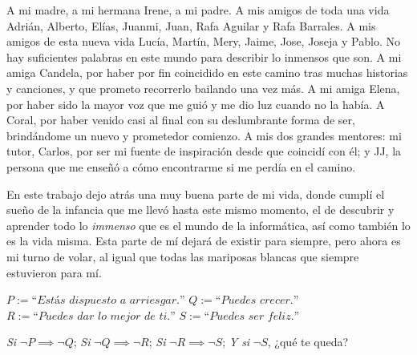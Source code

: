 A mi madre, a mi hermana Irene, a mi padre. A mis amigos de toda una vida Adrián, Alberto, Elías, Juanmi, Juan, Rafa Aguilar y Rafa Barrales. A mis amigos de esta nueva vida Lucía, Martín, Mery, Jaime, Jose, Joseja y Pablo. No hay suficientes palabras en este mundo para describir lo inmensos que son. A mi amiga Candela, por haber por fin coincidido en este camino tras muchas historias y canciones, y que prometo recorrerlo bailando una vez más. A mi amiga Elena, por haber sido la mayor voz que me guió y me dio luz cuando no la había. A Coral, por haber venido casi al final con su deslumbrante forma de ser, brindándome un nuevo y prometedor comienzo. A mis dos grandes mentores: mi tutor, Carlos, por ser mi fuente de inspiración desde que coincidí con él; y JJ, la persona que me enseñó a cómo encontrarme si me perdía en el camino.

\vspace{0.2cm}
En este trabajo dejo atrás una muy buena parte de mi vida, donde cumplí el sueño de la infancia que me llevó hasta este mismo momento, el de descubrir y aprender todo lo \textit{immenso} que es el mundo de la informática, así como también lo es la vida misma. Esta parte de mí dejará de existir para siempre, pero ahora es mi turno de volar, al igual que todas las mariposas blancas que siempre estuvieron para mí.

\newpage
\vspace*{\fill}

\large
\noindent
$P := \textit{``Estás dispuesto a arriesgar.''}$
\newline
$Q := \textit{``Puedes crecer.''}$
\newline
$R := \textit{``Puedes dar lo mejor de ti.''}$
\newline
$S := \textit{``Puedes ser feliz.''}$
\newline
\newline

\noindent
\textit{Si} $\neg P \implies \neg Q$;
\newline
\textit{Si} $\neg Q \implies \neg R$;
\newline
\textit{Si} $\neg R \implies \neg S$;
\newline
\textit{Y si} $\neg S$, ¿qué te queda?
\newline



\vspace*{\fill}
